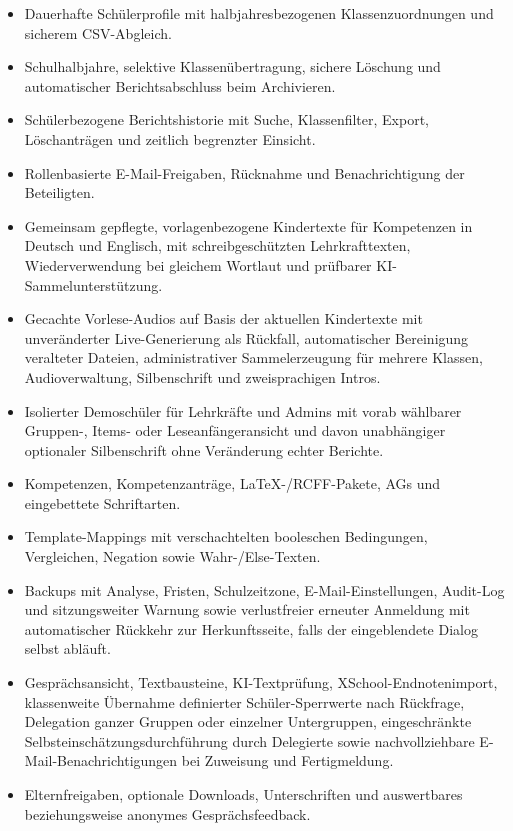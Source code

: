 \documentclass[12pt,a4paper]{article}
\begin{document}
\begin{itemize}
  \item Dauerhafte Schülerprofile mit halbjahresbezogenen Klassenzuordnungen und sicherem CSV-Abgleich.
  \item Schulhalbjahre, selektive Klassenübertragung, sichere Löschung und automatischer Berichtsabschluss beim Archivieren.
  \item Schülerbezogene Berichtshistorie mit Suche, Klassenfilter, Export, Löschanträgen und zeitlich begrenzter Einsicht.
  \item Rollenbasierte E-Mail-Freigaben, Rücknahme und Benachrichtigung der Beteiligten.
  \item Gemeinsam gepflegte, vorlagenbezogene Kindertexte für Kompetenzen in Deutsch und Englisch, mit schreibgeschützten Lehrkrafttexten, Wiederverwendung bei gleichem Wortlaut und prüfbarer KI-Sammelunterstützung.
  \item Gecachte Vorlese-Audios auf Basis der aktuellen Kindertexte mit unveränderter Live-Generierung als Rückfall, automatischer Bereinigung veralteter Dateien, administrativer Sammelerzeugung für mehrere Klassen, Audioverwaltung, Silbenschrift und zweisprachigen Intros.
  \item Isolierter Demoschüler für Lehrkräfte und Admins mit vorab wählbarer Gruppen-, Items- oder Leseanfängeransicht und davon unabhängiger optionaler Silbenschrift ohne Veränderung echter Berichte.
  \item Kompetenzen, Kompetenzanträge, LaTeX-/RCFF-Pakete, AGs und eingebettete Schriftarten.
  \item Template-Mappings mit verschachtelten booleschen Bedingungen, Vergleichen, Negation sowie Wahr-/Else-Texten.
  \item Backups mit Analyse, Fristen, Schulzeitzone, E-Mail-Einstellungen, Audit-Log und sitzungsweiter Warnung sowie verlustfreier erneuter Anmeldung mit automatischer Rückkehr zur Herkunftsseite, falls der eingeblendete Dialog selbst abläuft.
  \item Gesprächsansicht, Textbausteine, KI-Textprüfung, XSchool-Endnotenimport, klassenweite Übernahme definierter Schüler-Sperrwerte nach Rückfrage, Delegation ganzer Gruppen oder einzelner Untergruppen, eingeschränkte Selbsteinschätzungsdurchführung durch Delegierte sowie nachvollziehbare E-Mail-Benachrichtigungen bei Zuweisung und Fertigmeldung.
  \item Elternfreigaben, optionale Downloads, Unterschriften und auswertbares beziehungsweise anonymes Gesprächsfeedback.
\end{itemize}
\end{document}
